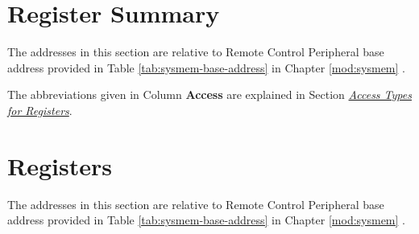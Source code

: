 \documentclass[main\_\_EN.tex]{subfiles}
\begin{document}


\newpage
\hypertarget{rmt-reg-summ}{}
\section{Register Summary}
\label{sec:rmt-reg-summ}

The addresses in this section are relative to Remote Control Peripheral base address provided in Table \ref{tab:sysmem-base-address} in Chapter \ref{mod:sysmem} \textit{}.

The abbreviations given in Column \textbf{Access} are explained in Section \hyperref[glossary-access-types]{\textit{Access Types for Registers}}.






\newpage
\section{Registers}

The addresses in this section are relative to Remote Control Peripheral base address provided in Table \ref{tab:sysmem-base-address} in Chapter \ref{mod:sysmem} \textit{}.


\end{document}
